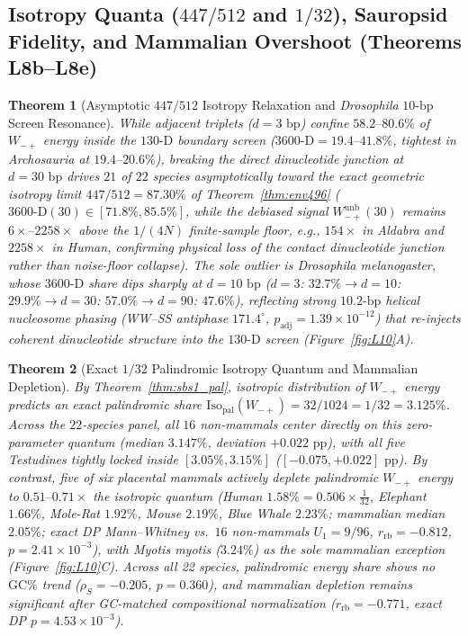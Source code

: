 \documentclass[11pt,a4paper]{article}
\renewcommand{\_}{\origunderscore\penalty200\relax}
\newtheorem{theorem}{Theorem}[section]
\theoremstyle{remark}
\begin{document}
\subsection{Isotropy Quanta (\texorpdfstring{$447/512$}{447/512} and \texorpdfstring{$1/32$}{1/32}), Sauropsid Fidelity, and Mammalian Overshoot (Theorems L8b--L8e)}
\begin{theorem}[Asymptotic $447/512$ Isotropy Relaxation and \textit{Drosophila} $10\text{-bp}$ Screen Resonance]
\label{thm:L8b}
While adjacent triplets ($d=3\text{ bp}$) confine $58.2\text{--}80.6\%$ of $W_{-+}$ energy inside the $130\text{-D}$ boundary screen ($\mathrm{3600\text{-}D} = 19.4\text{--}41.8\%$, tightest in Archosauria at $19.4\text{--}20.6\%$), breaking the direct dinucleotide junction at $d=30\text{ bp}$ drives $21$ of $22$ species asymptotically toward the exact geometric isotropy limit $447/512 = 87.30\%$ of Theorem~\ref{thm:env496} ($\mathrm{3600\text{-}D}(30) \in [71.8\%, 85.5\%]$, while the debiased signal $W_{-+}^{\mathrm{unb}}(30)$ remains $6\times\text{--}2258\times$ above the $1/(4N)$ finite-sample floor, e.g., $154\times$ in Aldabra and $2258\times$ in Human, confirming physical loss of the contact dinucleotide junction rather than noise-floor collapse). The sole outlier is \textit{Drosophila melanogaster}, whose $3600\text{-D}$ share dips sharply at $d=10\text{ bp}$ ($d=3$: $32.7\% \to d=10$: $29.9\% \to d=30$: $57.0\% \to d=90$: $47.6\%$), reflecting strong $10.2\text{-bp}$ helical nucleosome phasing (WW--SS antiphase $171.4^\circ$, $p_{\mathrm{adj}} = 1.39\times 10^{-12}$) that re-injects coherent dinucleotide structure into the $130\text{-D}$ screen (Figure~\ref{fig:L10}A).
\end{theorem}

\begin{theorem}[Exact $1/32$ Palindromic Isotropy Quantum and Mammalian Depletion]
\label{thm:L8c}
By Theorem~\ref{thm:sbs1_pal}, isotropic distribution of $W_{-+}$ energy predicts an exact palindromic share $\mathrm{Iso}_{\mathrm{pal}}(W_{-+}) = 32/1024 = 1/32 = 3.125\%$. Across the $22$-species panel, all $16$ non-mammals center directly on this zero-parameter quantum (median $3.147\%$, deviation $+0.022\text{ pp}$), with all five Testudines tightly locked inside $[3.05\%, 3.15\%]$ ($[-0.075, +0.022]\text{ pp}$). By contrast, five of six placental mammals actively deplete palindromic $W_{-+}$ energy to $0.51\text{--}0.71\times$ the isotropic quantum (Human $1.58\% = 0.506\times\frac{1}{32}$, Elephant $1.66\%$, Mole-Rat $1.92\%$, Mouse $2.19\%$, Blue Whale $2.23\%$; mammalian median $2.05\%$; exact DP Mann--Whitney vs.\ $16$ non-mammals $U_1 = 9/96$, $r_{\mathrm{rb}} = -0.812$, $p = 2.41 \times 10^{-3}$), with \textit{Myotis myotis} ($3.24\%$) as the sole mammalian exception (Figure~\ref{fig:L10}C). Across all 22 species, palindromic energy share shows no $\mathrm{GC}\%$ trend ($\rho_S = -0.205$, $p = 0.360$), and mammalian depletion remains significant after GC-matched compositional normalization ($r_{\mathrm{rb}} = -0.771$, exact DP $p = 4.53\times 10^{-3}$).
\end{theorem}
\end{document}
